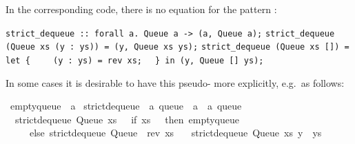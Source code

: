 \begin{isabellebody}
%
\isadelimquote
%
\endisadelimquote
%
\begin{isamarkuptext}%
\noindent In the corresponding code, there is no equation
  for the pattern :%
\end{isamarkuptext}%
\isamarkuptrue%
%
\isadelimquote
%
\endisadelimquote
%
\isatagquote
%
\begin{isamarkuptext}%
\isaverbatim%
\noindent%
\verb|strict_dequeue :: forall a. Queue a -> (a, Queue a);|\newline%
\verb|strict_dequeue (Queue xs (y : ys)) = (y, Queue xs ys);|\newline%
\verb|strict_dequeue (Queue xs []) =|\newline%
\verb|  let {|\newline%
\verb|    (y : ys) = rev xs;|\newline%
\verb|  } in (y, Queue [] ys);|%
\end{isamarkuptext}%
\isamarkuptrue%
%
\endisatagquote
{\isafoldquote}%
%
\isadelimquote
%
\endisadelimquote
%
\begin{isamarkuptext}%
\noindent In some cases it is desirable to have this
  pseudo- more explicitly, e.g.~as follows:%
\end{isamarkuptext}%
\isamarkuptrue%
%
\isadelimquote
%
\endisadelimquote
%
\isatagquote
{}\isamarkupfalse%
\ empty{\isacharunderscore}queue\ {\isacharcolon}{\isacharcolon}\ {\isacharprime}a\isanewline
\isanewline
{}\isamarkupfalse%
\ strict{\isacharunderscore}dequeue{\isacharprime}\ {\isacharcolon}{\isacharcolon}\ {\isachardoublequoteopen}{\isacharprime}a\ queue\ {\isasymRightarrow}\ {\isacharprime}a\ {\isasymtimes}\ {\isacharprime}a\ queue{\isachardoublequoteclose}\ \isanewline
\ \ {\isachardoublequoteopen}strict{\isacharunderscore}dequeue{\isacharprime}\ {\isacharparenleft}Queue\ xs\ {\isacharbrackleft}{\isacharbrackright}{\isacharparenright}\ {\isacharequal}\ {\isacharparenleft}if\ xs\ {\isacharequal}\ {\isacharbrackleft}{\isacharbrackright}\ then\ empty{\isacharunderscore}queue\isanewline
\ \ \ \ \ else\ strict{\isacharunderscore}dequeue{\isacharprime}\ {\isacharparenleft}Queue\ {\isacharbrackleft}{\isacharbrackright}\ {\isacharparenleft}rev\ xs{\isacharparenright}{\isacharparenright}{\isacharparenright}{\isachardoublequoteclose}\isanewline
\ \ {\isacharbar}\ {\isachardoublequoteopen}strict{\isacharunderscore}dequeue{\isacharprime}\ {\isacharparenleft}Queue\ xs\ {\isacharparenleft}y\ {\isacharhash}\ ys{\isacharparenright}{\isacharparenright}\ {\isacharequal}\isanewline

\end{isabellebody}
